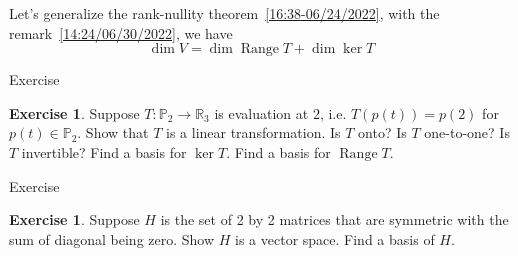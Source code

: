 \documentclass{beamer}
\DeclareMathOperator{\Range}{Range}
\theoremstyle{definition}
\newtheorem{exercise}[theorem]{Exercise}
\theoremstyle{remark}
\begin{document}
\begin{frame}[t]
\begin{theorem}
Let's generalize the rank-nullity theorem~\ref{16:38-06/24/2022}, with the remark~\ref{14:24/06/30/2022}, we have
\[
\dim V=\dim\Range T+\dim\ker T
\]
\end{theorem}
\end{frame}

\begin{frame}[t]{Exercise}
\begin{exercise}
Suppose $T:\mathbb P_2\to\mathbb R_3$ is evaluation at $2$, i.e. $T(p(t))=p(2)$ for $p(t)\in\mathbb P_2$. Show that $T$ is a linear transformation. Is $T$ onto? Is $T$ one-to-one? Is $T$ invertible? Find a basis for $\ker T$. Find a basis for $\Range T$.
\end{exercise}
\end{frame}

\begin{frame}[t]{Exercise}
\begin{exercise}
Suppose $H$ is the set of 2 by 2 matrices that are symmetric with the sum of diagonal being zero. Show $H$ is a vector space. Find a basis of $H$.
\end{exercise}
\end{frame}


\end{document}
